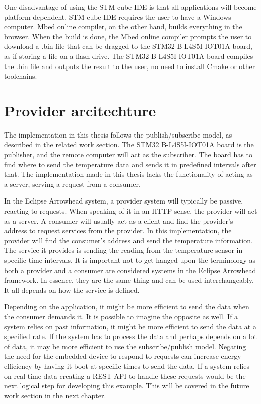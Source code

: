One disadvantage of using the STM cube IDE is that all applications will become platform-dependent.
STM cube IDE requires the user to have a Windows computer. 
Mbed online compiler, on the other hand, builds everything in the browser.
When the build is done, the Mbed online compiler prompts the user to download a .bin file that can be dragged to the STM32 B-L4S5I-IOT01A board, as if storing a file on a flash drive.
The STM32 B-L4S5I-IOT01A board compiles the .bin file and outputs the result to the user, no need to install Cmake or other toolchains. 

\section{Provider arcitechture}
The implementation in this thesis follows the publish/subscribe model, as described in the related work section. 
The STM32 B-L4S5I-IOT01A board is the publisher, and the remote computer will act as the subscriber.
The board has to find where to send the temperature data and sends it in predefined intervals after that. 
The implementation made in this thesis lacks the functionality of acting as a server, serving a request from a consumer.


In the Eclipse Arrowhead system, a provider system will typically be passive, reacting to requests.
When speaking of it in an HTTP sense, the provider will act as a server.
A consumer will usually act as a client and find the provider's address to request services from the provider. 
In this implementation, the provider will find the consumer's address and send the temperature information.
The service it provides is sending the reading from the temperature sensor in specific time intervals. 
It is important not to get hanged upon the terminology as both a provider and a consumer are considered systems in the Eclipse Arrowhead framework. 
In essence, they are the same thing and can be used interchangeably.
It all depends on how the service is defined.

Depending on the application, it might be more efficient to send the data when the consumer demands it. 
It is possible to imagine the opposite as well.
If a system relies on past information, it might be more efficient to send the data at a specified rate.
If the system has to process the data and perhaps depends on a lot of data, it may be more efficient to use the subscribe/publish model. 
Negating the need for the embedded device to respond to requests can increase energy efficiency by having it boot at specific times to send the data.
If a system relies on real-time data creating a REST API to handle these requests would be the next logical step for developing this example. 
This will be covered in the future work section in the next chapter.

